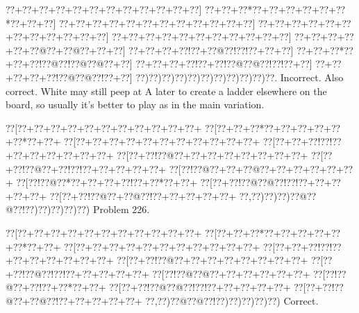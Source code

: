 \documentclass[a5paper]{article}
\begin{document}
\begin{center}
{\goo
\0??+\0??+\0??+\0??+\0??+\0??+\0??+\0??+\0??+\0??+\0??+\0??]
\0??+\0??+\0??*\0??+\0??+\0??+\0??+\0??+\0??*\0??+\0??+\0??]
\0??+\0??+\0??+\0??+\0??+\0??+\0??+\0??+\0??+\0??+\0??+\0??]
\0??+\0??+\0??+\0??+\0??+\0??+\0??+\0??+\0??+\0??+\0??+\0??]
\0??+\0??+\0??+\0??+\0??+\0??+\0??+\0??+\0??+\0??+\0??]
\0??+\0??+\0??+\0??+\0??+\0??@\0??+\0??@\0??+\0??+\0??]
\0??+\0??+\0??+\0??!\0??+\0??@\0??!\0??!\0??+\0??+\0??]
\0??+\0??+\0??*\0??+\0??+\0??!\0??@\0??!\0??@\0??@\0??+\0??]
\0??+\0??+\0??+\0??!\0??+\0??!\0??@\0??@\0??!\0??!\0??+\0??]
\0??+\0??+\0??+\0??+\0??!\0??@\0??@\0??!\0??+\0??]
\0??)\0??)\0??)\0??)\0??)\0??)\0??)\0??)\0??)\0??)\0??.
}
Incorrect. Also correct. White may still peep at A later to create a ladder elsewhere on the board, so usually it's better to play as in the main variation.

\end{center}
\newpage
\begin{center}
{\goo
\0??[\0??+\0??+\0??+\0??+\0??+\0??+\0??+\0??+\0??+\0??+\0??+
\0??[\0??+\0??+\0??*\0??+\0??+\0??+\0??+\0??+\0??*\0??+\0??+
\0??[\0??+\0??+\0??+\0??+\0??+\0??+\0??+\0??+\0??+\0??+\0??+
\0??[\0??+\0??+\0??!\0??!\0??+\0??+\0??+\0??+\0??+\0??+\0??+
\0??[\0??+\0??!\0??@\0??+\0??+\0??+\0??+\0??+\0??+\0??+\0??+
\0??[\0??+\0??!\0??@\0??+\0??!\0??!\0??+\0??+\0??+\0??+\0??+
\0??[\0??!\0??@\0??+\0??+\0??@\0??+\0??+\0??+\0??+\0??+\0??+
\0??[\0??!\0??@\0??*\0??+\0??+\0??+\0??!\0??+\0??*\0??+\0??+
\0??[\0??+\0??!\0??@\0??@\0??!\0??!\0??+\0??+\0??+\0??+\0??+
\0??[\0??+\0??!\0??@\0??+\0??@\0??!\0??+\0??+\0??+\0??+\0??+
\0??,\0??)\0??)\0??)\0??@\0??@\0??!\0??)\0??)\0??)\0??)\0??)
}
Problem 226.

\end{center}
\begin{center}
{\goo
\0??[\0??+\0??+\0??+\0??+\0??+\0??+\0??+\0??+\0??+\0??+\0??+
\0??[\0??+\0??+\0??*\0??+\0??+\0??+\0??+\0??+\0??*\0??+\0??+
\0??[\0??+\0??+\0??+\0??+\0??+\0??+\0??+\0??+\0??+\0??+\0??+
\0??[\0??+\0??+\0??!\0??!\0??+\0??+\0??+\0??+\0??+\0??+\0??+
\0??[\0??+\0??!\0??@\0??+\0??+\0??+\0??+\0??+\0??+\0??+\0??+
\0??[\0??+\0??!\0??@\0??!\0??!\0??+\0??+\0??+\0??+\0??+
\0??[\0??!\0??@\0??@\0??+\0??+\0??+\0??+\0??+\0??+
\0??[\0??!\0??@\0??+\0??!\0??+\0??*\0??+\0??+
\0??[\0??+\0??!\0??@\0??@\0??!\0??!\0??+\0??+\0??+\0??+\0??+
\0??[\0??+\0??!\0??@\0??+\0??@\0??!\0??+\0??+\0??+\0??+\0??+
\0??,\0??)\0??@\0??@\0??!\0??)\0??)\0??)\0??)\0??)
}
Correct. 

\end{center}
\end{document}
